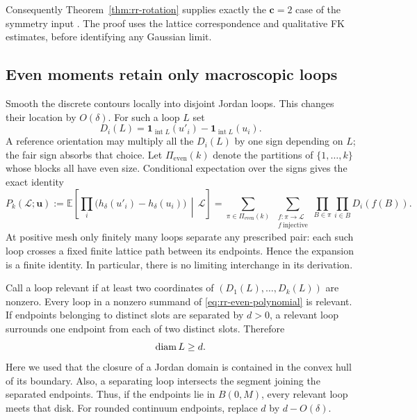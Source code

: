Consequently Theorem~\ref{thm:rr-rotation} supplies exactly the
$\mathbf c=2$ case of the symmetry input
\cite[Theorem~4.1]{DKLM2026}. The proof uses the lattice correspondence
and qualitative FK estimates,
before identifying any Gaussian limit.

\subsection{Even moments retain only macroscopic loops}

Smooth the discrete contours locally into disjoint Jordan loops.  This
changes their location by $O(\delta)$.  For such a loop $L$ set
\[
 D_i(L)=\mathbf1_{\operatorname{int}L}(u'_i)
                   -\mathbf1_{\operatorname{int}L}(u_i).
\]
A reference orientation may multiply all the $D_i(L)$ by one sign
depending on $L$; the fair sign absorbs that choice.  Let
$\Pi_{\mathrm{even}}(k)$ denote the partitions of $\{1,\ldots,k\}$
whose blocks all have even size.  Conditional expectation over the
signs gives the exact identity
\begin{equation}
 P_k(\mathcal L;\boldsymbol u)
 :=\mathbb E\left[\prod_i
       \bigl(h_\delta(u'_i)-h_\delta(u_i)\bigr)
                         \,\middle|\,\mathcal L\right]
 =\sum_{\pi\in\Pi_{\mathrm{even}}(k)}
   \ \sum_{\substack{f:\pi\to\mathcal L\\f\ \mathrm{injective}}}
          \prod_{B\in\pi}\prod_{i\in B}D_i(f(B)).
 \label{eq:rr-even-polynomial}
\end{equation}
At positive mesh only finitely many loops separate any prescribed
pair: each such loop crosses a fixed finite lattice path between its
endpoints.  Hence the expansion is a finite identity.  In particular,
there is no limiting interchange in its derivation.

Call a loop relevant if at least two coordinates of
$(D_1(L),\ldots,D_k(L))$ are nonzero.  Every loop in a nonzero summand
of \eqref{eq:rr-even-polynomial} is relevant.  If endpoints belonging
to distinct slots are separated by $d>0$, a relevant loop surrounds
one endpoint from each of two distinct slots.  Therefore
\begin{equation}
 \operatorname{diam} L\ge d.
 \label{eq:rr-macro}
\end{equation}
Here we used that the closure of a Jordan domain is contained in the
convex hull of its boundary.  Also, a separating loop intersects the
segment joining the separated endpoints.  Thus, if the endpoints lie
in $B(0,M)$, every relevant loop meets that disk.  For rounded
continuum endpoints, replace $d$ by $d-O(\delta)$.

